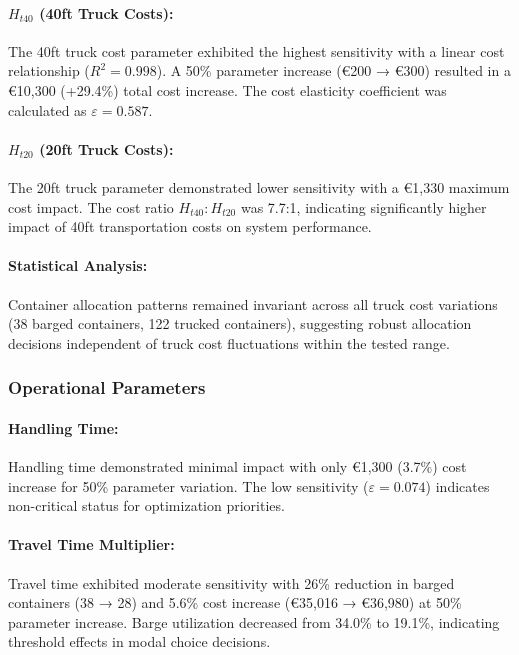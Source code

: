 \documentclass[12pt,a4paper]{article}
\begin{document}
\paragraph{$H_{t40}$ (40ft Truck Costs):}
The 40ft truck cost parameter exhibited the highest sensitivity with a linear cost relationship ($R^2 = 0.998$). A 50\% parameter increase (€200 → €300) resulted in a €10,300 (+29.4\%) total cost increase. The cost elasticity coefficient was calculated as $\varepsilon = 0.587$.

\paragraph{$H_{t20}$ (20ft Truck Costs):}
The 20ft truck parameter demonstrated lower sensitivity with a €1,330 maximum cost impact. The cost ratio $H_{t40}:H_{t20}$ was 7.7:1, indicating significantly higher impact of 40ft transportation costs on system performance.

\paragraph{Statistical Analysis:}
Container allocation patterns remained invariant across all truck cost variations (38 barged containers, 122 trucked containers), suggesting robust allocation decisions independent of truck cost fluctuations within the tested range.

\subsubsection{Operational Parameters}

\paragraph{Handling Time:}
Handling time demonstrated minimal impact with only €1,300 (3.7\%) cost increase for 50\% parameter variation. The low sensitivity ($\varepsilon = 0.074$) indicates non-critical status for optimization priorities.

\paragraph{Travel Time Multiplier:}
Travel time exhibited moderate sensitivity with 26\% reduction in barged containers (38 → 28) and 5.6\% cost increase (€35,016 → €36,980) at 50\% parameter increase. Barge utilization decreased from 34.0\% to 19.1\%, indicating threshold effects in modal choice decisions.
\end{document}
